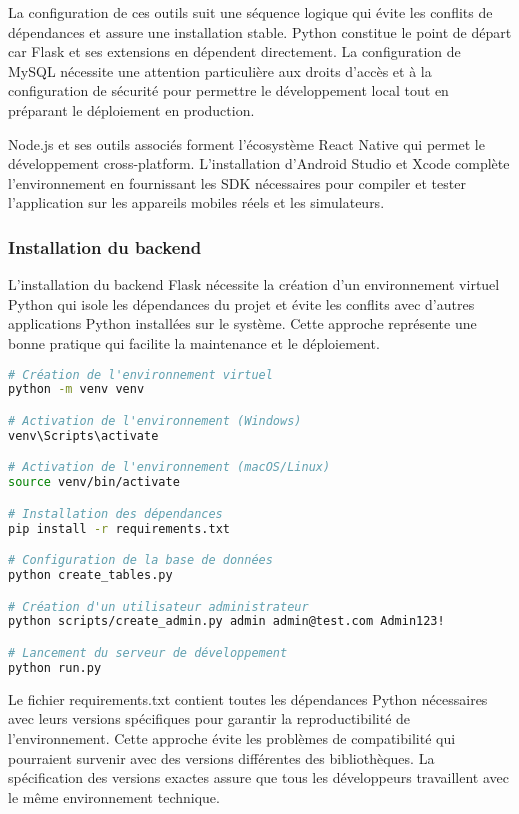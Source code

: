 La configuration de ces outils suit une séquence logique qui évite les conflits de dépendances et assure une installation stable. Python constitue le point de départ car Flask et ses extensions en dépendent directement. La configuration de MySQL nécessite une attention particulière aux droits d'accès et à la configuration de sécurité pour permettre le développement local tout en préparant le déploiement en production.

Node.js et ses outils associés forment l'écosystème React Native qui permet le développement cross-platform. L'installation d'Android Studio et Xcode complète l'environnement en fournissant les SDK nécessaires pour compiler et tester l'application sur les appareils mobiles réels et les simulateurs.

\subsubsection{Installation du backend}

L'installation du backend Flask nécessite la création d'un environnement virtuel Python qui isole les dépendances du projet et évite les conflits avec d'autres applications Python installées sur le système. Cette approche représente une bonne pratique qui facilite la maintenance et le déploiement.

\begin{lstlisting}[language=bash, caption=Installation du backend Flask]
# Création de l'environnement virtuel
python -m venv venv

# Activation de l'environnement (Windows)
venv\Scripts\activate

# Activation de l'environnement (macOS/Linux)
source venv/bin/activate

# Installation des dépendances
pip install -r requirements.txt

# Configuration de la base de données
python create_tables.py

# Création d'un utilisateur administrateur
python scripts/create_admin.py admin admin@test.com Admin123!

# Lancement du serveur de développement
python run.py
\end{lstlisting}

Le fichier requirements.txt contient toutes les dépendances Python nécessaires avec leurs versions spécifiques pour garantir la reproductibilité de l'environnement. Cette approche évite les problèmes de compatibilité qui pourraient survenir avec des versions différentes des bibliothèques. La spécification des versions exactes assure que tous les développeurs travaillent avec le même environnement technique.

